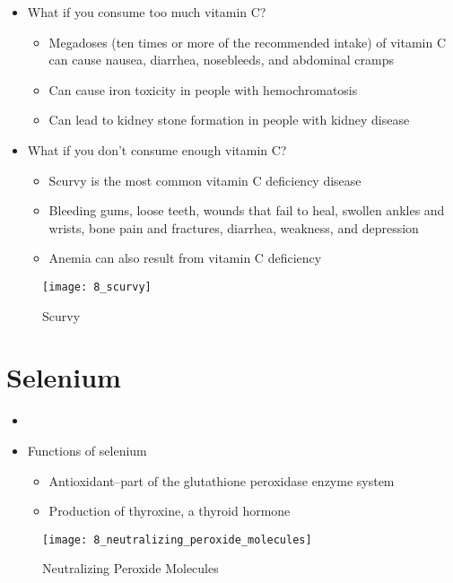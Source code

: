 \documentclass[title={Chapter 8}]{fdsn201notes}
\begin{document}
\begin{itemize}
	\item What if you consume too much vitamin C?
	\begin{itemize}
		\item Megadoses (ten times or more of the recommended intake) of vitamin C can cause nausea, diarrhea, nosebleeds, and abdominal cramps
		\item Can cause iron toxicity in people with hemochromatosis
		\item Can lead to kidney stone formation in people with kidney disease
	\end{itemize}
	\item What if you don’t consume enough vitamin C?
	\begin{itemize}
		\item Scurvy is the most common vitamin C deficiency disease
		\item Bleeding gums, loose teeth, wounds that fail to heal, swollen ankles and wrists, bone pain and fractures, diarrhea, weakness, and depression
		\item Anemia can also result from vitamin C deficiency
	\end{itemize}
\end{itemize}

\begin{figure}[H]
	\centering
	\texttt{[image: 8\_scurvy]}
	\caption{Scurvy}
	\label{fig:scurvy}
\end{figure}

\section{Selenium}\label{sec:Selenium}
\begin{itemize}
	\item {}
	\item Functions of selenium
	\begin{itemize}
		\item Antioxidant--part of the glutathione peroxidase enzyme system
		\item Production of thyroxine, a thyroid hormone
	\end{itemize}
\end{itemize}

\begin{figure}[H]
	\centering
	\texttt{[image: 8\_neutralizing\_peroxide\_molecules]}
	\caption{Neutralizing Peroxide Molecules}
	\label{fig:neutralizing-peroxide-molecules}
\end{figure}
\end{document}
